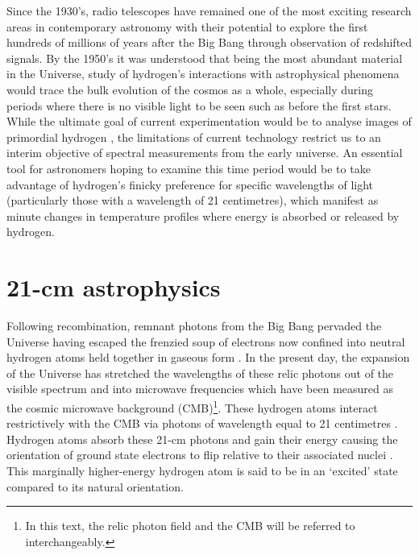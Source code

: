 Since the 1930’s, radio telescopes have remained one of the most exciting research areas in contemporary astronomy with their potential to explore the first hundreds of millions of years after the Big Bang through observation of redshifted signals. By the 1950’s it was understood that being the most abundant material in the Universe, study of hydrogen’s interactions with astrophysical phenomena would trace the bulk evolution of the cosmos as a whole, especially during periods where there is no visible light to be seen such as before the first stars. While the ultimate goal of current experimentation would be to analyse images of primordial hydrogen \citep{liuData,21in21}, the limitations of current technology restrict us to an interim objective of spectral measurements from the early universe. An essential tool for astronomers hoping to examine this time period would be to take advantage of hydrogen’s finicky preference for specific wavelengths of light (particularly those with a wavelength of 21 centimetres), which manifest as minute changes in temperature profiles where energy is absorbed or released by hydrogen.


\section{21-cm astrophysics}\label{sec:21cm}
Following recombination, remnant photons from the Big Bang pervaded the Universe having escaped the frenzied soup of electrons now confined into neutral hydrogen atoms held together in gaseous form \citep{ryden}. In the present day, the expansion of the Universe has stretched the wavelengths of these relic photons out of the visible spectrum and into microwave frequencies which have been measured as the cosmic microwave background (CMB)\footnote{In this text, the relic photon field and the CMB will be referred to interchangeably.}. These hydrogen atoms interact restrictively with the CMB via photons of wavelength equal to 21 centimetres \citep{lofar}. Hydrogen atoms absorb these 21-cm photons and gain their energy causing the orientation of ground state electrons to flip relative to their associated nuclei \citep{furProbe}. This marginally higher-energy hydrogen atom is said to be in an ‘excited’ state compared to its natural orientation. 


